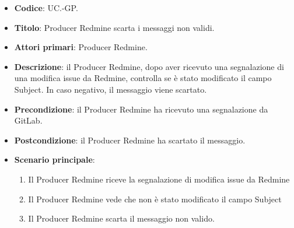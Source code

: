	\begin{itemize}
		\item \textbf{Codice}: UC\theuccount.\thesubuccount-GP.
		\item \textbf{Titolo}: Producer Redmine scarta i messaggi non validi.
		\item \textbf{Attori primari}: Producer Redmine.
		\item \textbf{Descrizione}: il Producer Redmine, dopo aver ricevuto una segnalazione di una modifica issue da Redmine, controlla
		se è stato modificato il campo Subject. In caso negativo, il messaggio viene scartato.
		\item \textbf{Precondizione}: il Producer Redmine ha ricevuto una segnalazione da GitLab.
		\item \textbf{Postcondizione}: il Producer Redmine ha scartato il messaggio.
		\item \textbf{Scenario principale}: 
		\begin{enumerate}
			\item Il Producer Redmine riceve la segnalazione di modifica issue da Redmine
			\item Il Producer Redmine vede che non è stato modificato il campo Subject
			\item Il Producer Redmine scarta il messaggio non valido.
		\end{enumerate}
	\end{itemize}